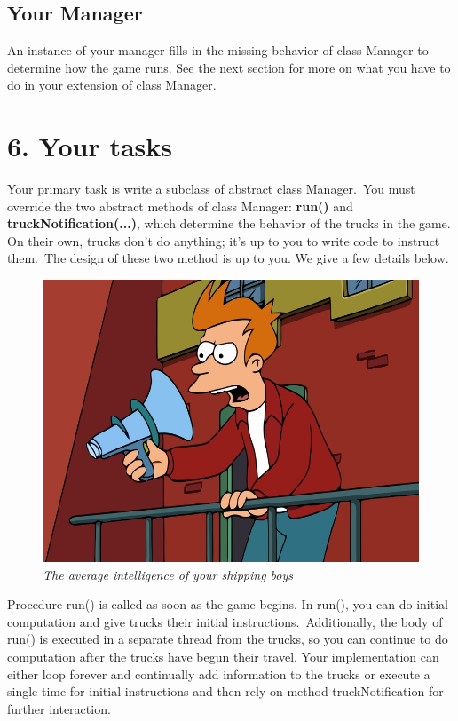 \documentclass[11pt]{article}
\begin{document}
\subsection{Your Manager}
An instance of your manager fills in the missing behavior of class Manager to determine how the game runs. See the next section for more on what you have to do in your extension of class Manager.

\section{6. Your tasks}
Your primary task is write a subclass of abstract class Manager.\ You must override the two abstract methods of class Manager: \textbf{run()} and \textbf{truckNotification(...)}, which determine the behavior of the trucks in the game. On their own, trucks don't do anything; it's up to you to write code to instruct them.\ The
design of these two method is up to you. We give a few details below.\\

\begin{figure}[h]
\centerline{\includegraphics[scale=0.35]{fry.jpg}} 
\caption{\em{The average intelligence of your shipping boys}}
\end{figure}

Procedure run() is called as soon as the game begins. In run(), you can do initial computation and give trucks their initial instructions.\ Additionally, the body of run() is executed in a separate thread from the trucks, so you can continue to do computation after the trucks have begun their travel. Your implementation can either loop forever and continually add information to the trucks or execute a single time for initial instructions and then rely on method truckNotification for further interaction.\\
\end{document}
